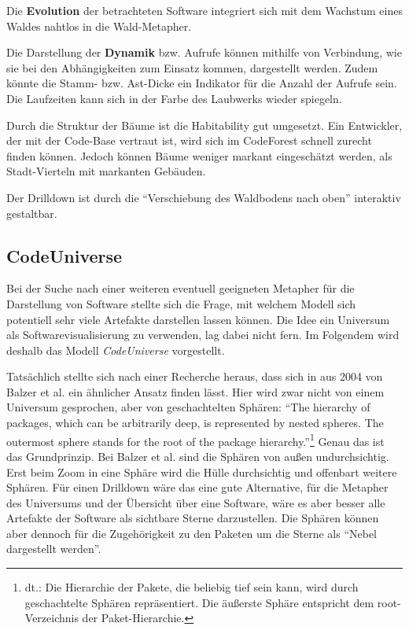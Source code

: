 Die \textbf{Evolution} der betrachteten Software integriert sich mit dem Wachstum eines Waldes nahtlos in die Wald-Metapher.

Die Darstellung der \textbf{Dynamik} bzw. Aufrufe können mithilfe von Verbindung, wie sie bei den Abhängigkeiten zum Einsatz kommen, dargestellt werden. Zudem könnte die Stamm- bzw. Ast-Dicke ein Indikator für die Anzahl der Aufrufe sein. Die Laufzeiten kann sich in der Farbe des Laubwerks wieder spiegeln.

Durch die Struktur der Bäume ist die Habitability gut umgesetzt. Ein Entwickler, der mit der Code-Base vertraut ist, wird sich im CodeForest schnell zurecht finden können. Jedoch können Bäume weniger markant eingeschätzt werden, als Stadt-Vierteln mit markanten Gebäuden.

Der Drilldown ist durch die "`Verschiebung des Waldbodens nach oben"' interaktiv gestaltbar.

\subsection{CodeUniverse}

Bei der Suche nach einer weiteren eventuell geeigneten Metapher für die Darstellung von Software stellte sich die Frage, mit welchem Modell sich potentiell sehr viele Artefakte darstellen lassen können. Die Idee ein Universum als Softwarevisualisierung zu verwenden, lag dabei nicht fern. Im Folgendem wird deshalb das Modell \textit{CodeUniverse} vorgestellt.

Tatsächlich stellte sich nach einer Recherche heraus, dass sich in \cite{balzer2004software} aus 2004 von Balzer et al. ein ähnlicher Ansatz finden lässt. Hier wird zwar nicht von einem Universum gesprochen, aber von geschachtelten Sphären: ``The hierarchy of packages, which can be arbitrarily deep, is represented by nested spheres. The outermost sphere stands for the root of the package hierarchy.''\footnote{dt.: Die Hierarchie der Pakete, die beliebig tief sein kann, wird durch geschachtelte Sphären repräsentiert. Die äußerste Sphäre entspricht dem root-Verzeichnis der Paket-Hierarchie.} \cite{balzer2004software} Genau das ist das Grundprinzip. Bei Balzer et al. sind die Sphären von außen undurchsichtig. Erst beim Zoom in eine Sphäre wird die Hülle durchsichtig und offenbart weitere Sphären. Für einen Drilldown wäre das eine gute Alternative, für die Metapher des Universums und der Übersicht über eine Software, wäre es aber besser alle Artefakte der Software als sichtbare Sterne darzustellen. Die Sphären können aber dennoch für die Zugehörigkeit zu den Paketen um die Sterne als "`Nebel dargestellt werden"'.

